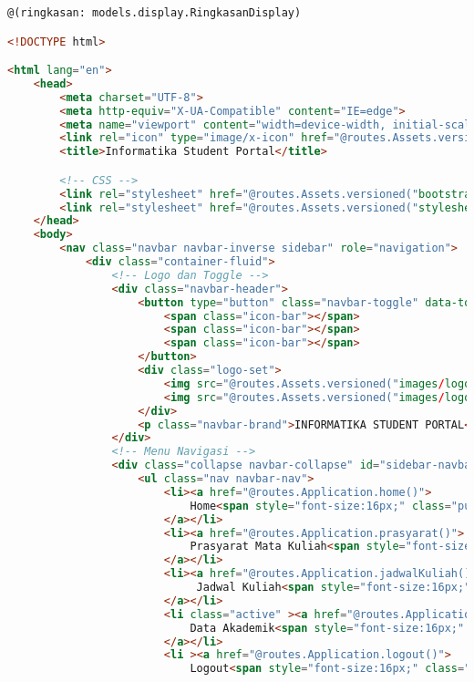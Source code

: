 \singlespacing 
\begin{lstlisting}[language=html,basicstyle=\tiny,caption=ringkasan.scala.html]
@(ringkasan: models.display.RingkasanDisplay)

<!DOCTYPE html>

<html lang="en">
    <head>
        <meta charset="UTF-8">
		<meta http-equiv="X-UA-Compatible" content="IE=edge">
        <meta name="viewport" content="width=device-width, initial-scale=1">
        <link rel="icon" type="image/x-icon" href="@routes.Assets.versioned("images/logo-IT.png")" />
		<title>Informatika Student Portal</title>

		<!-- CSS -->
        <link rel="stylesheet" href="@routes.Assets.versioned("bootstrap/css/bootstrap.min.css")">
        <link rel="stylesheet" href="@routes.Assets.versioned("stylesheets/main.css")"> 
    </head>
    <body>
		<nav class="navbar navbar-inverse sidebar" role="navigation">
			<div class="container-fluid">
				<!-- Logo dan Toggle -->
				<div class="navbar-header">
					<button type="button" class="navbar-toggle" data-toggle="collapse" data-target="#sidebar-navbar-collapse">
						<span class="icon-bar"></span>
						<span class="icon-bar"></span>
						<span class="icon-bar"></span>
					</button>
					<div class="logo-set">
						<img src="@routes.Assets.versioned("images/logo-unpar.png")" width="25%" height="25%"/>
						<img src="@routes.Assets.versioned("images/logo-IT.png")" width="25%" height="25%"/>
					</div>
					<p class="navbar-brand">INFORMATIKA STUDENT PORTAL</p>
				</div>
				<!-- Menu Navigasi -->
				<div class="collapse navbar-collapse" id="sidebar-navbar-collapse">
					<ul class="nav navbar-nav">
						<li><a href="@routes.Application.home()">
							Home<span style="font-size:16px;" class="pull-right hidden-xs showopacity glyphicon glyphicon-home"></span>
						</a></li>
						<li><a href="@routes.Application.prasyarat()">
							Prasyarat Mata Kuliah<span style="font-size:16px;" class="pull-right hidden-xs showopacity glyphicon glyphicon-tasks"></span>
						</a></li>
						<li><a href="@routes.Application.jadwalKuliah()">
							 Jadwal Kuliah<span style="font-size:16px;" class="pull-right hidden-xs showopacity glyphicon glyphicon-calendar"></span>
						</a></li>
						<li class="active" ><a href="@routes.Application.ringkasan()">
							Data Akademik<span style="font-size:16px;" class="pull-right hidden-xs showopacity glyphicon glyphicon-book"></span>
						</a></li>
						<li ><a href="@routes.Application.logout()">
							Logout<span style="font-size:16px;" class="pull-right hidden-xs showopacity glyphicon glyphicon-log-out"></span>

\end{lstlisting}
